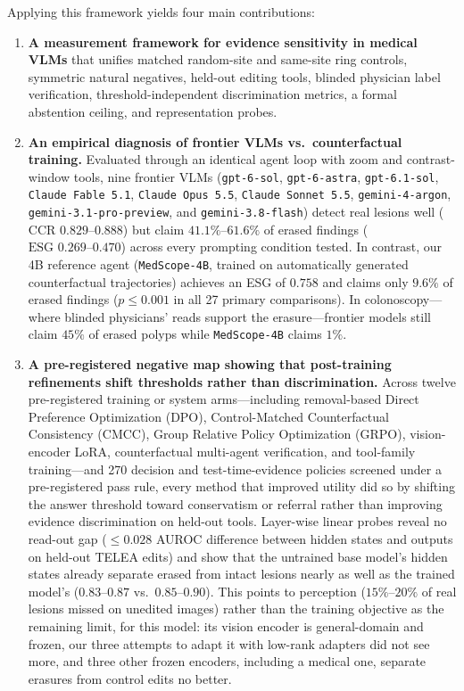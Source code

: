 \documentclass[5p,times,twocolumn,authoryear]{elsarticle}
\begin{document}
Applying this framework yields four main contributions:
\begin{enumerate}[leftmargin=*,nosep]
    \item \textbf{A measurement framework for evidence sensitivity in medical VLMs} that unifies matched random-site and same-site ring controls, symmetric natural negatives, held-out editing tools, blinded physician label verification, threshold-independent discrimination metrics, a formal abstention ceiling, and representation probes.
    \item \textbf{An empirical diagnosis of frontier VLMs vs.\ counterfactual training.} Evaluated through an identical agent loop with zoom and contrast-window tools, nine frontier VLMs (\texttt{gpt-6-sol}, \texttt{gpt-6-astra}, \texttt{gpt-6.1-sol}, \texttt{Claude Fable 5.1}, \texttt{Claude Opus 5.5}, \texttt{Claude Sonnet 5.5}, \texttt{gemini-4-argon}, \texttt{gemini-3.1-pro-preview}, and \texttt{gemini-3.8-flash}) detect real lesions well ($\text{CCR } 0.829\text{--}0.888$) but claim $41.1\%\text{--}61.6\%$ of erased findings ($\text{ESG } 0.269\text{--}0.470$) across every prompting condition tested. In contrast, our 4B reference agent (\texttt{MedScope-4B}, trained on automatically generated counterfactual trajectories) achieves an ESG of $0.758$ and claims only $9.6\%$ of erased findings ($p \le 0.001$ in all 27 primary comparisons). In colonoscopy---where blinded physicians' reads support the erasure---frontier models still claim $45\%$ of erased polyps while \texttt{MedScope-4B} claims $1\%$.
    \item \textbf{A pre-registered negative map showing that post-training refinements shift thresholds rather than discrimination.} Across twelve pre-registered training or system arms---including removal-based Direct Preference Optimization (DPO), Control-Matched Counterfactual Consistency (CMCC), Group Relative Policy Optimization (GRPO), vision-encoder LoRA, counterfactual multi-agent verification, and tool-family training---and 270 decision and test-time-evidence policies screened under a pre-registered pass rule, every method that improved utility did so by shifting the answer threshold toward conservatism or referral rather than improving evidence discrimination on held-out tools. Layer-wise linear probes reveal no read-out gap ($\le 0.028$ AUROC difference between hidden states and outputs on held-out TELEA edits) and show that the untrained base model's hidden states already separate erased from intact lesions nearly as well as the trained model's ($0.83\text{--}0.87$ vs.\ $0.85\text{--}0.90$). This points to perception ($15\%\text{--}20\%$ of real lesions missed on unedited images) rather than the training objective as the remaining limit, for this model: its vision encoder is general-domain and frozen, our three attempts to adapt it with low-rank adapters did not see more, and three other frozen encoders, including a medical one, separate erasures from control edits no better.

\end{enumerate}
\end{document}
